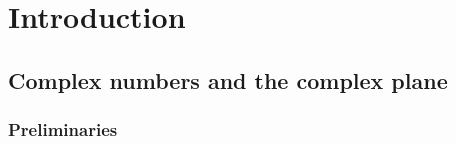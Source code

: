 \documentclass[11pt,a4paper]{article}
\begin{document}
\maketitle


\newpage
\tableofcontents
\newpage

\section{Introduction}

\subsection{Complex numbers and the complex plane}

\subsubsection{Preliminaries}
\end{document}
